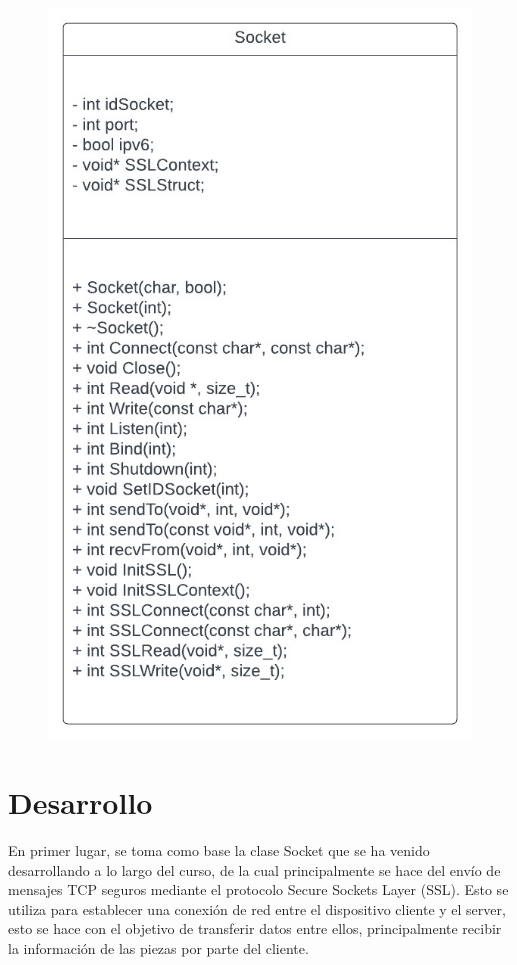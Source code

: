 \documentclass[a4paper,10pt]{article}
\begin{document}
	 \begin{figure}[ht]
 	  \centering
 	  \includegraphics[scale=2]{Socket.jpeg}
	 \end{figure}
    \vfill
    \clearpage
	\newpage
	
	\section{Desarrollo}
	En primer lugar, se toma como base la clase Socket que se ha venido desarrollando a lo largo del curso, de la cual principalmente se hace del envío de mensajes TCP seguros mediante el protocolo Secure Sockets Layer (SSL). Esto se utiliza para establecer una conexión de red entre el dispositivo cliente y el server, esto se hace con el objetivo de transferir datos entre ellos, principalmente recibir la información de las piezas por parte del cliente.
 
\end{document}
